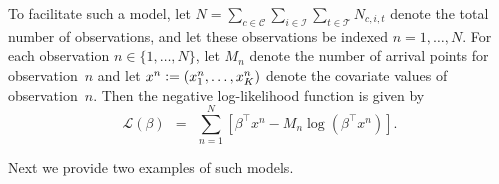 \documentclass[article]{jss}
\def\defi{\vcentcolon=}
\begin{document}
To facilitate such a model, let $N = \sum_{c \in \mathcal{C}} \sum_{i \in \mathcal{I}} \sum_{t \in \mathcal{T}} N_{c,i,t}$ denote the total number of observations, and let these observations be indexed $n = 1,\ldots,N$.
For each observation $n \in \{1,\ldots,N\}$, let $M_{n}$ denote the number of arrival points for observation~$n$ and let $x^{n} \defi (x^{n}_{1},\ldots,x^{n}_{K})$ denote the covariate values of observation~$n$.
Then the negative log-likelihood function is given by
\begin{equation}
\label{eqn:maxlikelihood3}
\mathscr{L}(\beta) \ \ = \ \ \sum_{n=1}^{N} \left[\beta^{\top} x^{n} - M_{n} \log\left(\beta^{\top} x^{n}\right)\right].
\end{equation}

Next we provide two examples of such models.
\end{document}

